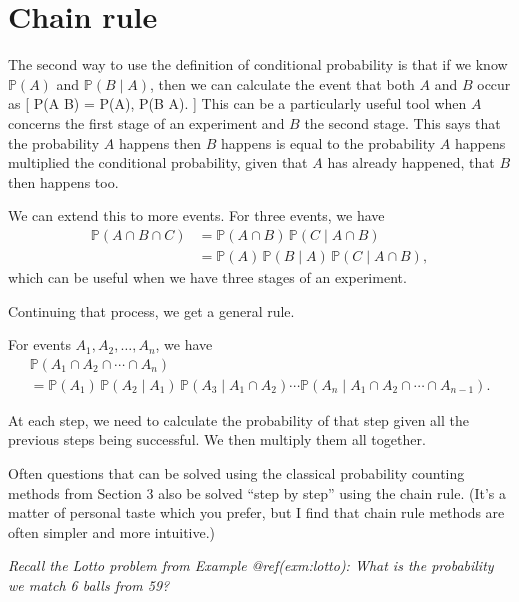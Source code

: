 \documentclass[
  letterpaper,
]{report}
\theoremstyle{definition}
\theoremstyle{definition}
\theoremstyle{remark}
\begin{document}
\hypertarget{chain-rule}{%
\section{Chain rule}\label{chain-rule}}

The second way to use the definition of conditional probability is that
if we know \(\mathbb P(A)\) and \(\mathbb P(B \mid A)\), then we can
calculate the event that both \(A\) and \(B\) occur as {[} \mathbb P(A
\cap B) = \mathbb P(A), \mathbb P(B \mid A). {]} This can be a
particularly useful tool when \(A\) concerns the first stage of an
experiment and \(B\) the second stage. This says that the probability
\(A\) happens then \(B\) happens is equal to the probability \(A\)
happens multiplied the conditional probability, given that \(A\) has
already happened, that \(B\) then happens too.

We can extend this to more events. For three events, we have
\begin{align*}
\mathbb P(A \cap B \cap C)
  &= \mathbb P(A \cap B) \, \mathbb P(C \mid A \cap B) \\
  &= \mathbb P(A) \, \mathbb P(B \mid A)\, \mathbb P(C \mid A \cap B) ,
\end{align*} which can be useful when we have three stages of an
experiment.

Continuing that process, we get a general rule.

\leavevmode{}%
For events \(A_1, A_2, \dots, A_n\), we have
\begin{multline*}  \mathbb P(A_1 \cap A_2 \cap \cdots \cap A_n) \\
  = \mathbb P(A_1) \, \mathbb P(A_2 \mid A_1) \, \mathbb P(A_3 \mid A_1 \cap A_2) \cdots \mathbb P(A_n \mid A_1 \cap A_2 \cap \cdots \cap  A_{n-1}) .\end{multline*}

At each step, we need to calculate the probability of that step given
all the previous steps being successful. We then multiply them all
together.

Often questions that can be solved using the classical probability
counting methods from Section 3 also be solved ``step by step'' using
the chain rule. (It's a matter of personal taste which you prefer, but I
find that chain rule methods are often simpler and more intuitive.)

\emph{Recall the Lotto problem from Example @ref(exm:lotto): What is the
probability we match 6 balls from 59?}
\end{document}
